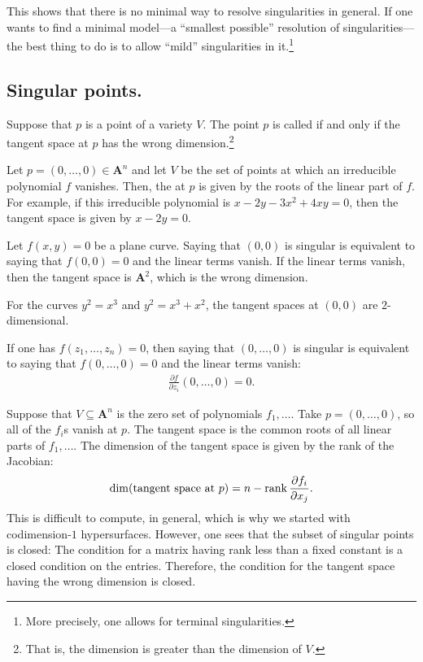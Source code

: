 \documentclass [11 pt, oneside] {article}
\begin{document}
	This shows that there is no minimal way to resolve singularities in general. If one wants to find a minimal model---a ``smallest possible'' resolution of singularities---the best thing to do is to allow ``mild'' singularities in it.\footnote{More precisely, one allows for terminal singularities.}

\subsection{Singular points.}
Suppose that $p$ is a point of a variety $V$. The point $p$ is called  if and only if the tangent space at $p$ has the wrong dimension.\footnote{That is, the dimension is greater than the dimension of $V$.}

Let $p=(0,\hdots, 0)\in  \mathbf{A}^n$ and let $V$ be the set of points at which an irreducible polynomial $f$ vanishes. Then, the  at $p$ is given by the roots of the linear part of $f$. For example, if this irreducible polynomial is $x-2y-3x^2+4xy =0$, then the tangent space is given by $x-2y=0$.

Let $f(x,y)=0$ be a plane curve. Saying that $(0,0)$ is singular is equivalent to saying that $f(0,0)=0$ and the linear terms vanish. If the linear terms vanish, then the tangent space is $\mathbf{A}^2$, which is the wrong dimension.

\begin{example}[ ]\label{}\text{}
For the curves $y^2 = x^3$ and $y^2 = x^3+x^2$, the tangent spaces at $(0,0)$ are $2$-dimensional.
\end{example}

If one has $f(z_1,\hdots, z_n) =0$, then saying that $(0,\hdots, 0)$ is singular is equivalent to saying that $f(0,\hdots,0)=0$ and the linear terms vanish: 
\begin{align*}
	\frac{\partial f}{\partial z_i}(0,\hdots, 0) =0.
\end{align*}

Suppose that $V\subseteq \mathbf{A}^n$ is the zero set of polynomials $f_1,\hdots$. Take $p=(0,\hdots, 0)$, so all of the $f_i$s vanish at $p$. The tangent space is the common roots of all linear parts of $f_1,\hdots$. The dimension of the tangent space is given by the rank of the Jacobian:
\begin{align*}
	\dim(\textrm{tangent space at $p$}) = n-\operatorname{rank} \frac{\partial f_i}{\partial x_j}.
\end{align*}
This is difficult to compute, in general, which is why we started with codimension-$1$ hypersurfaces. However, one sees that the subset of singular points is closed: The condition for a matrix having rank less than a fixed constant is a closed condition on the entries. Therefore, the condition for the tangent space having the wrong dimension is closed.
\end{document}
